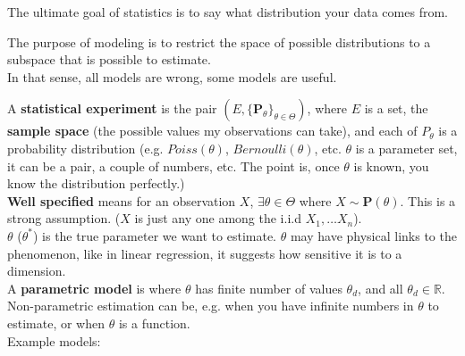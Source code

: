 \documentclass{article}
\begin{document}
The ultimate goal of statistics is to say what distribution your data comes from.

The purpose of modeling is to restrict the space of possible distributions to a subspace that is possible to estimate.
\\
In that sense, all models are wrong, some models are useful.

A \textbf{statistical experiment} is the pair $(E, \{ \mathbf{P}_{\theta} \}_{\theta \in \Theta})$, where $E$ is a set, the \textbf{sample space} (the possible values my observations can take), and each of $P_{\theta}$ is a probability distribution
(e.g. $Poiss(\theta)$, $Bernoulli(\theta)$, etc. $\theta$ is a parameter set, it can be a pair, a couple of numbers, etc. The point is, once $\theta$ is known, you know the distribution perfectly.)
\\
\textbf{Well specified} means for an observation $X$, $\exists \theta \in \Theta$ where $X \sim \mathbf{P}(\theta)$.
This is a strong assumption. ($X$ is just any one among the i.i.d $X_1, \dots X_n$).
\\
$\theta$ ($\theta^*$) is the true parameter we want to estimate.
$\theta$ may have physical links to the phenomenon, like in linear regression, it suggests how sensitive it is to a dimension.
\\
A \textbf{parametric model} is where $\theta$ has finite number of values $\theta_d$, and all $\theta_d \in \mathbb{R}$.
\\
Non-parametric estimation can be, e.g. when you have infinite numbers in $\theta$ to estimate, or when $\theta$ is a function.
\\
Example models:
\end{document}
